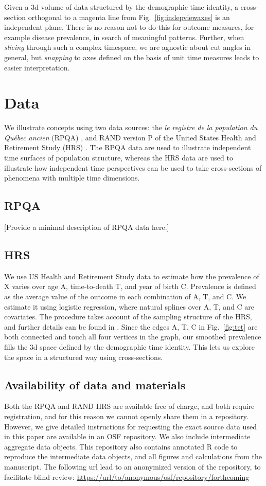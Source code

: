 \documentclass{bmcart}
\begin{document}
Given a 3d volume of data structured by the demographic time identity, a cross-section orthogonal to a magenta line from Fig.~\ref{fig:indepviewaxes} is an independent plane. There is no reason not to do this for outcome measures, for example disease prevalence, in search of meaningful patterns. Further, when \emph{slicing} through such a complex timespace, we are agnostic about cut angles in general, but \emph{snapping} to axes defined on the basis of unit time measures leads to easier interpretation.

\section*{Data}
We illustrate concepts using two data sources: the \emph{le registre de la population du Qu\'{e}bec ancien} (RPQA) \citep{desjardins1998}, and RAND version P of the United States Health and Retirement Study (HRS) \citep{HRS, RAND}. The RPQA data are used to illustrate independent time surfaces of population structure, whereas the HRS data are used to illustrate how independent time perspectives can be used to take cross-sections of phenomena with multiple time dimensions.

\subsection*{RPQA}
[Provide a minimal description of RPQA data here.]

\subsection*{HRS}
We use US Health and Retirement Study data to estimate how the prevalence of X varies over age A, time-to-death T, and year of birth C. Prevalence is defined as the average value of the outcome in each combination of A, T, and C. We estimate it using logistic regression, where natural splines over A, T, and C are covariates. The procedure takes account of the sampling structure of the HRS, and further details can be found in \citet{riffe2017hle}. Since the edges A, T, C in Fig.~\ref{fig:tet} are both connected and touch all four vertices in the graph, our smoothed prevalence fills the 3d space defined by the demographic time identity. This lets us explore the space in a structured way using cross-sections.

\subsection*{Availability of data and materials}
Both the RPQA and RAND HRS are available free of charge, and both require registration, and for this reason we cannot openly share them in a repository. However, we give detailed instructions for requesting the exact source data used in this paper are available in an OSF repository. We also include intermediate aggregate data objects. This repository also contains annotated R code to reproduce the intermediate data objects, and all figures and calculations from the manuscript.
The following url lead to an anonymized version of the repository, to facilitate blind review:
\url{https://url/to/anonymous/osf/repository/forthcoming}
\end{document}
